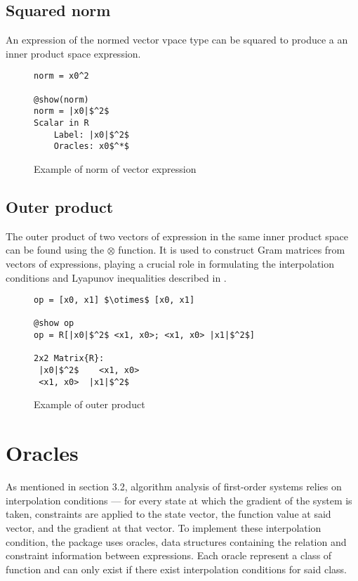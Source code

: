 \subsection*{Squared norm}
An expression of the normed vector vpace type can be squared to produce a an inner product space expression.
\begin{figure}[!h]
	\begin{lstlisting}[mathescape]
norm = x0^2

@show(norm)
norm = |x0|$^2$
Scalar in R
	Label: |x0|$^2$
	Oracles: x0$^*$
\end{lstlisting}
\caption{Example of norm of vector expression}
\label{ex_norm}
\end{figure}

\subsection*{Outer product}
The outer product of two vectors of expression in the same inner product space can be found using the $\otimes$ function. It is used to construct Gram matrices from vectors of expressions, playing a crucial role in formulating the interpolation conditions and Lyapunov inequalities described in .

\begin{figure}[!h]
	\begin{lstlisting}[mathescape]
op = [x0, x1] $\otimes$ [x0, x1]

@show op
op = R[|x0|$^2$ <x1, x0>; <x1, x0> |x1|$^2$]

2x2 Matrix{R}:
 |x0|$^2$    <x1, x0>
 <x1, x0>  |x1|$^2$

\end{lstlisting}
\caption{Example of outer product}
\label{ex_outerproduct}
\end{figure}

\section{Oracles} \label{sec:oracles}
As mentioned in section 3.2, algorithm analysis of first-order systems relies on interpolation conditions --- for every state at which the gradient of the system is taken, constraints are applied to the state vector, the function value at said vector, and the gradient at that vector. To implement these interpolation condition, the package uses oracles, data structures containing the relation and constraint information between expressions. Each oracle represent a class of function and can only exist if there exist interpolation conditions for said class.


